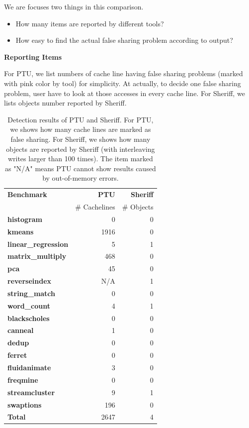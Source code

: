 We are focuses two things in this comparison.
\begin{itemize}
\item
How many items are reported by different tools?
\item 
How easy to find the actual false sharing problem according to output?
\end{itemize}

\par\vspace{3mm}
\noindent
\textbf{Reporting Items}
\par\vspace{3mm}
\noindent
For PTU, we list numbers of cache line having false sharing problems (marked with pink color
by tool) for simplicity. At actually, to decide one false sharing problem,  
user have to look at those accesses in every cache line. 
For Sheriff, we lists objects number reported by Sheriff.

\begin{table}
\centering
\begin{tabular}{|l|r|r|}
\hline
{\bf \small Benchmark} & {\bf \small PTU} & {\bf \small Sheriff}\\
 & {\# Cachelines} & {\# Objects}\\
\hline
\small \textbf{histogram} & 0 & 0 \\
\small \textbf{kmeans} & 1916 & 0 \\
\small \textbf{linear\_regression} & 5 & 1 \\
\small \textbf{matrix\_multiply} & 468 & 0\\
\small \textbf{pca} & 45 & 0 \\
\small \textbf{reverseindex} & N/A & 1 \\
\small \textbf{string\_match} & 0 & 0 \\
\small \textbf{word\_count} & 4 & 1\\
\hline
\small \textbf{blackscholes} & 0 & 0 \\
\small \textbf{canneal} & 1 & 0 \\
\small \textbf{dedup} & 0 & 0 \\
\small \textbf{ferret} & 0 & 0\\
\small \textbf{fluidanimate} & 3 & 0 \\
\small \textbf{freqmine} & 0 & 0 \\
\small \textbf{streamcluster} & 9 & 1\\
\small \textbf{swaptions} & 196 & 0\\
\hline
\small \textbf{Total} & 2647 & 4\\
\hline
\end{tabular}
\caption{Detection results of PTU and Sheriff. For PTU, we shows 
how many cache lines are marked as false sharing. For Sheriff,
we shows how many objects are reported by Sheriff (with interleaving writes larger than 100 times). 
The item marked as "N/A" means PTU cannot show results caused by out-of-memory errors. 
\label{table:detection}}
\end{table}

